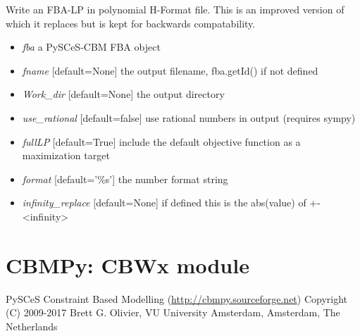 \documentclass[a4paper,11pt,english]{sphinxmanual}
\begin{document}

\begin{fulllineitems}
\label{modules_doc:cbmpy.CBWrite.writeStoichiometricMatrix}
Write an FBA-LP in polynomial H-Format file. This is an improved version of 
which it replaces but is kept for backwards compatability.
\begin{itemize}
\item {} 
\emph{fba} a PySCeS-CBM FBA object

\item {} 
\emph{fname} {[}default=None{]} the output filename, fba.getId() if not defined

\item {} 
\emph{Work\_dir} {[}default=None{]} the output directory

\item {} 
\emph{use\_rational} {[}default=false{]} use rational numbers in output (requires sympy)

\item {} 
\emph{fullLP} {[}default=True{]} include the default objective function as a maximization target

\item {} 
\emph{format} {[}default='\%s'{]} the number format string

\item {} 
\emph{infinity\_replace} {[}default=None{]} if defined this is the abs(value) of +-\textless{}infinity\textgreater{}

\end{itemize}

\end{fulllineitems}

\label{modules_doc:module-cbmpy.CBWx}

\section{CBMPy: CBWx module}
\label{modules_doc:cbmpy-cbwx-module}
PySCeS Constraint Based Modelling (\url{http://cbmpy.sourceforge.net})
Copyright (C) 2009-2017 Brett G. Olivier, VU University Amsterdam, Amsterdam, The Netherlands
\end{document}
